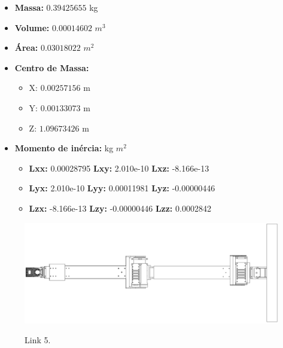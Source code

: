\documentclass[
12pt,					%
openright,				%
twoside,				%
a4paper,				%
english,
brazil
]{ABNT/abntex2_report}
\begin{document}
	\begin{itemize}
		\item \textbf{Massa:} $0.39425655$ kg
		\item \textbf{Volume:} $0.00014602$ $m^{3}$
		\item \textbf{Área:} $0.03018022$ $m^{2}$
		\item \textbf{Centro de  Massa:}
		\begin{itemize}
			\item X: $0.00257156$ m			
			\item Y: $0.00133073$ m			
			\item Z: $1.09673426$ m			
		\end{itemize}
		
		\item \textbf{Momento de inércia:} kg $m^{2}$
		\begin{itemize}
			\item \textbf{Lxx:}	0.00028795 \textbf{Lxy:} 2.010e-10 \textbf{Lxz:} -8.166e-13			  
			\item \textbf{Lyx:} 2.010e-10 \textbf{Lyy:} 0.00011981 \textbf{Lyz:} -0.00000446			  
			\item \textbf{Lzx:} -8.166e-13 \textbf{Lzy:} -0.00000446 \textbf{Lzz:} 0.0002842			  
		\end{itemize}
	\end{itemize}

	\begin{figure}[H]
		\centering
		\caption{Link 5.}
		\includegraphics[scale=1.2]{appendix/link5.jpg}
		\label{fig:link5}
	\end{figure}
\end{document}
